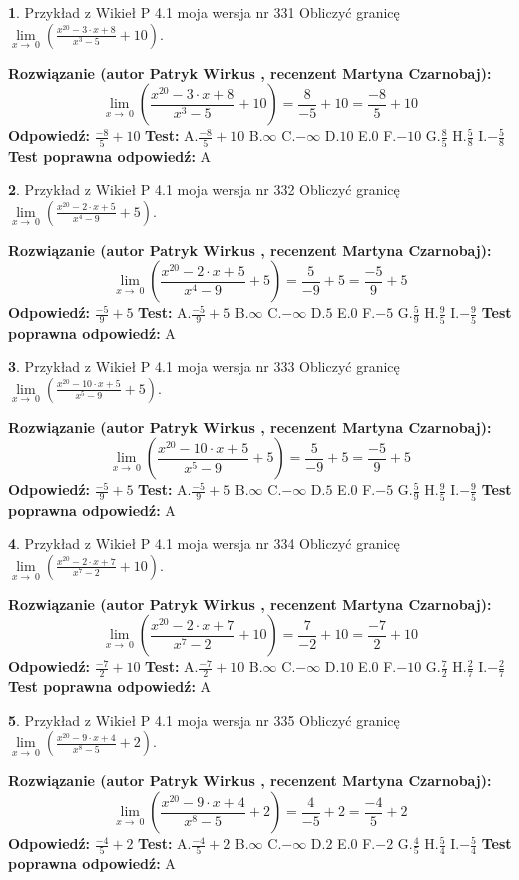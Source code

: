\documentclass[12pt, a4paper]{article}
\theoremstyle{definition} %
\newtheorem{zad}{}
\newcommand{\zadStart}[1]{\begin{zad}#1\newline}
\newcommand{\zadStop}{\end{zad}}
\newcommand{\rozwStart}[2]{\noindent \textbf{Rozwiązanie (autor #1 , recenzent #2): }\newline}
\newcommand{\rozwStop}{\newline}
\newcommand{\odpStart}{\noindent \textbf{Odpowiedź:}\newline}
\newcommand{\odpStop}{\newline}
\newcommand{\testStart}{\noindent \textbf{Test:}\newline}
\newcommand{\testStop}{\newline}
\newcommand{\kluczStart}{\noindent \textbf{Test poprawna odpowiedź:}\newline}
\newcommand{\kluczStop}{\newline}
\begin{document}
\zadStart{Przykład z Wikieł P 4.1 moja wersja nr 331}
Obliczyć granicę $\lim\limits_{x\to\ 0}(\frac{x^{20}-3 \cdot x +8}{x^{3}-5}+10)$.
\zadStop
\rozwStart{Patryk Wirkus}{Martyna Czarnobaj}
$$\lim\limits_{x\to\ 0}(\frac{x^{20}-3 \cdot x +8}{x^{3}-5}+10)=\frac{8}{-5}+10=\frac{-8}{5}+10$$
\rozwStop
\odpStart
$\frac{-8}{5}+10$
\odpStop
\testStart
A.$\frac{-8}{5}+10$
B.$\infty$
C.$-\infty$
D.$10$
E.$0$
F.$-10$
G.$\frac{8}{5}$
H.$\frac{5}{8}$
I.$-\frac{5}{8}$
\testStop
\kluczStart
A
\kluczStop



\zadStart{Przykład z Wikieł P 4.1 moja wersja nr 332}
Obliczyć granicę $\lim\limits_{x\to\ 0}(\frac{x^{20}-2 \cdot x +5}{x^{4}-9}+5)$.
\zadStop
\rozwStart{Patryk Wirkus}{Martyna Czarnobaj}
$$\lim\limits_{x\to\ 0}(\frac{x^{20}-2 \cdot x +5}{x^{4}-9}+5)=\frac{5}{-9}+5=\frac{-5}{9}+5$$
\rozwStop
\odpStart
$\frac{-5}{9}+5$
\odpStop
\testStart
A.$\frac{-5}{9}+5$
B.$\infty$
C.$-\infty$
D.$5$
E.$0$
F.$-5$
G.$\frac{5}{9}$
H.$\frac{9}{5}$
I.$-\frac{9}{5}$
\testStop
\kluczStart
A
\kluczStop



\zadStart{Przykład z Wikieł P 4.1 moja wersja nr 333}
Obliczyć granicę $\lim\limits_{x\to\ 0}(\frac{x^{20}-10 \cdot x +5}{x^{5}-9}+5)$.
\zadStop
\rozwStart{Patryk Wirkus}{Martyna Czarnobaj}
$$\lim\limits_{x\to\ 0}(\frac{x^{20}-10 \cdot x +5}{x^{5}-9}+5)=\frac{5}{-9}+5=\frac{-5}{9}+5$$
\rozwStop
\odpStart
$\frac{-5}{9}+5$
\odpStop
\testStart
A.$\frac{-5}{9}+5$
B.$\infty$
C.$-\infty$
D.$5$
E.$0$
F.$-5$
G.$\frac{5}{9}$
H.$\frac{9}{5}$
I.$-\frac{9}{5}$
\testStop
\kluczStart
A
\kluczStop



\zadStart{Przykład z Wikieł P 4.1 moja wersja nr 334}
Obliczyć granicę $\lim\limits_{x\to\ 0}(\frac{x^{20}-2 \cdot x +7}{x^{7}-2}+10)$.
\zadStop
\rozwStart{Patryk Wirkus}{Martyna Czarnobaj}
$$\lim\limits_{x\to\ 0}(\frac{x^{20}-2 \cdot x +7}{x^{7}-2}+10)=\frac{7}{-2}+10=\frac{-7}{2}+10$$
\rozwStop
\odpStart
$\frac{-7}{2}+10$
\odpStop
\testStart
A.$\frac{-7}{2}+10$
B.$\infty$
C.$-\infty$
D.$10$
E.$0$
F.$-10$
G.$\frac{7}{2}$
H.$\frac{2}{7}$
I.$-\frac{2}{7}$
\testStop
\kluczStart
A
\kluczStop



\zadStart{Przykład z Wikieł P 4.1 moja wersja nr 335}
Obliczyć granicę $\lim\limits_{x\to\ 0}(\frac{x^{20}-9 \cdot x +4}{x^{8}-5}+2)$.
\zadStop
\rozwStart{Patryk Wirkus}{Martyna Czarnobaj}
$$\lim\limits_{x\to\ 0}(\frac{x^{20}-9 \cdot x +4}{x^{8}-5}+2)=\frac{4}{-5}+2=\frac{-4}{5}+2$$
\rozwStop
\odpStart
$\frac{-4}{5}+2$
\odpStop
\testStart
A.$\frac{-4}{5}+2$
B.$\infty$
C.$-\infty$
D.$2$
E.$0$
F.$-2$
G.$\frac{4}{5}$
H.$\frac{5}{4}$
I.$-\frac{5}{4}$
\testStop
\kluczStart
A
\kluczStop
\end{document}
